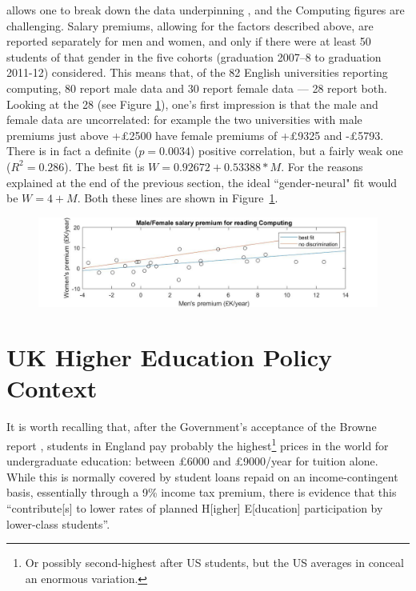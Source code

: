 \documentclass[sigconf,anonymous]{acmart}
\begin{document}
\cite{BBC2018f} allows one to break down the data underpinning
\cite{DfE2018d}, and the Computing figures are challenging.  Salary
premiums, allowing for the factors described above, are reported
separately for men and women, and only if there were at least 50
students of that gender in the five cohorts (graduation 2007--8 to
graduation 2011-12) considered. This means that, of the 82 English
universities reporting computing, 80 report male data and 30 report
female data --- 28 report both. Looking at the 28 (see Figure
\ref{fig:BBC}), one's first impression is that the male and female
data are uncorrelated: for example the two universities with male
premiums just above +\pounds2500 have female premiums of +\pounds9325
and -\pounds5793. There is in fact a definite ($p=0.0034$) positive
correlation, but a fairly weak one ($R^2=0.286$). The best fit is
$W=0.92672+0.53388*M$. For the reasons explained at the end of the
previous section, the ideal ``gender-neural" fit would be
$W=4+M$. Both these lines are shown in Figure~\ref{fig:BBC}.

\begin{figure}
\includegraphics[width=\textwidth]{BBCSalaryDatav5.jpg}
\caption{\label{fig:BBC}}
\end{figure}

\section{UK Higher Education Policy Context}\label{ukhepolicy}

It is worth recalling that, after the Government's acceptance of the
Browne report \cite{BIS2010a}, students in England pay probably the
highest\footnote{Or possibly second-highest after US students, but the
US averages in \cite[Table B5.1]{OECD2016a} conceal an enormous
variation.} prices in the world for undergraduate education: between
\pounds6000 and \pounds9000/year for tuition alone. While this is
normally covered by student loans repaid on an income-contingent
basis, essentially through a 9\% income tax premium, there is evidence
\cite{CallenderMason2017a} that this ``contribute[s] to lower rates of
planned H[igher] E[ducation] participation by lower-class students''.
\end{document}
